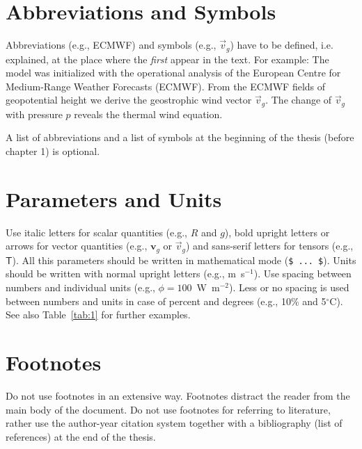 \section{Abbreviations and Symbols}
Abbreviations (e.g., ECMWF) and symbols (e.g., $\vec{v}_g$) have to be
defined, i.e. explained, at the place where the \emph{first} appear in the text.
For example: The model was initialized with the operational analysis of the
European Centre for Medium-Range Weather Forecasts (ECMWF). From the ECMWF
fields of geopotential height we derive the geostrophic wind vector
$\vec{v}_g$. The change of $\vec{v}_g$ with pressure $p$ reveals the thermal
wind equation.

A list of abbreviations and a list of symbols at the beginning of the thesis
(before chapter 1) is optional.


\section{Parameters and Units}

Use italic letters for scalar quantities (e.g., $R$ and $g$), bold upright
letters or arrows for vector quantities (e.g., $\mathbf{v}_g$ or $\vec{v}_g$)
and sans-serif letters for tensors (e.g., $\mathsf{T}$). All this parameters
should be written in mathematical mode (\verb|$ ... $|). Units should be
written with normal upright letters (e.g., m~s$^{-1}$). Use spacing between
numbers and individual units (e.g., $\phi=100$~W~m$^{-2}$). Less or no spacing
is used between numbers and units in case of percent and degrees (e.g.,
10\% and 5$^{\circ}$C). See also Table~\ref{tab:1} for further examples.


\section{Footnotes}
Do not use footnotes in an extensive way. Footnotes distract the reader from the
main body of the document. Do not use footnotes for referring to literature,
rather use the author-year citation system together with a bibliography (list
of references) at the end of the thesis.